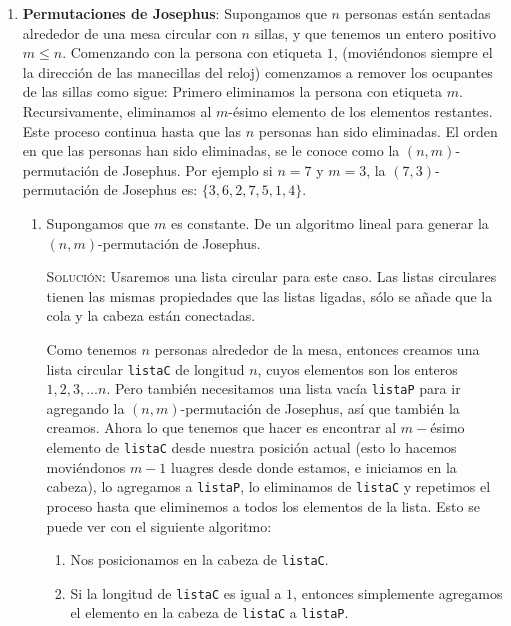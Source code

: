 \documentclass[letterpaper,11pt]{article}
\begin{document}
\begin{enumerate}
    \item {\bf Permutaciones de Josephus}: Supongamos que $n$ personas están 
    sentadas alrededor de una mesa circular con $n$ sillas, y que tenemos un
    entero positivo $m \leq n$. Comenzando con la persona con etiqueta $1$,
    (moviéndonos siempre el la dirección de las manecillas del reloj) comenzamos
    a remover los ocupantes de las sillas como sigue: Primero eliminamos la 
    persona con etiqueta $m$. Recursivamente, eliminamos al $m$-ésimo elemento 
    de los elementos restantes. Este proceso continua hasta que las $n$ personas 
    han sido eliminadas. El orden en que las personas han sido eliminadas, se 
    le conoce como la $(n, m)$-permutación de Josephus. Por ejemplo si $n=7$ y 
    $m=3$, la $(7,3)$-permutaci\'on de Josephus es: $\{3,6,2,7,5,1,4\}$.
         
    \begin{enumerate}
        \item Supongamos que $m$ es constante. De un algoritmo lineal para generar
        la $(n,m)$-permutación de Josephus.

        \textsc{Solución:} Usaremos una lista circular para este caso. Las listas 
        circulares tienen las mismas propiedades que las listas ligadas, sólo se 
        añade que la cola y la cabeza están conectadas.

        Como tenemos $n$ personas alrededor de la mesa, entonces creamos una lista 
        circular \texttt{listaC} de longitud $n$, cuyos elementos son los enteros 
        $1, 2, 3, \ldots n$. Pero también necesitamos una lista vacía 
        \texttt{listaP} para ir agregando la $(n, m)$-permutación de Josephus, 
        así que también la creamos. Ahora lo que tenemos que hacer es encontrar 
        al $m-$ésimo elemento de \texttt{listaC} desde nuestra posición actual 
        (esto lo hacemos moviéndonos $m-1$ luagres desde donde estamos, e 
        iniciamos en la cabeza), lo agregamos a \texttt{listaP}, lo eliminamos
        de \texttt{listaC} y repetimos el proceso hasta que eliminemos a todos 
        los elementos de la lista. Esto se puede ver con el siguiente algoritmo:
        \begin{enumerate}
            \item Nos posicionamos en la cabeza de \texttt{listaC}.

            \item Si la longitud de \texttt{listaC} es igual a $1$, entonces 
            simplemente agregamos el elemento en la cabeza de \texttt{listaC} a
            \texttt{listaP}. 


\end{enumerate}
\end{enumerate}
\end{enumerate}
\end{document}
